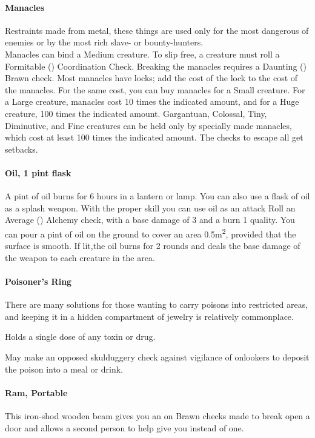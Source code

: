 \begin{multicols}{2}
\paragraph{Manacles} \label{advitm:manacles}
Restraints made from metal, these things are used only for
the most dangerous of enemies or by the most rich slave- or
bounty-hunters.\\
Manacles can bind a Medium creature. To slip free, a
creature must roll a Formitable (\difficulty\difficulty\difficulty\difficulty)
Coordination Check.  Breaking the manacles requires a
Daunting (\difficulty\difficulty\difficulty\difficulty) Brawn check.
Most manacles have locks; add the cost of the lock
to the cost of the manacles.
For the same cost, you can buy manacles for a Small
creature. For a Large creature, manacles cost 10 times
the indicated amount, and for a Huge creature, 100
times the indicated amount. Gargantuan, Colossal, Tiny,
Diminutive, and Fine creatures can be held only by
specially made manacles, which cost at least 100 times
the indicated amount.
The checks to escape all get setbacks.

\paragraph{Oil, 1 pint flask} \label{advitm:oil}
A pint of oil burns for 6 hours in a lantern or lamp.
You can also use a flask of oil as a splash weapon.
With the proper skill you can use oil as an attack
Roll an Average (\difficulty\difficulty) Alchemy check,
with a base damage of 3 and a burn 1 quality. You
can pour a pint of oil on the ground to cover an
area 0.5m\textsuperscript{2}, provided that the surface is
smooth. If lit,the oil burns for 2 rounds and deals
the base damage of the weapon to each creature in
the area.

\paragraph{Poisoner's Ring} \label{advitm:poisoner_ring}
There are many solutions for those wanting to carry poisons
into restricted areas, and keeping it in a hidden
compartment of jewelry is relatively commonplace.

Holds a single dose of any toxin or drug.

May make an opposed skulduggery check against vigilance
of onlookers to deposit the poison into a meal or drink.

\paragraph{Ram, Portable} \label{advitm:ram}
This iron-shod wooden beam gives you an \boost on
Brawn checks made to break open a door and
allows a second person to help give you \boost\boost
instead of one.


\end{multicols}
